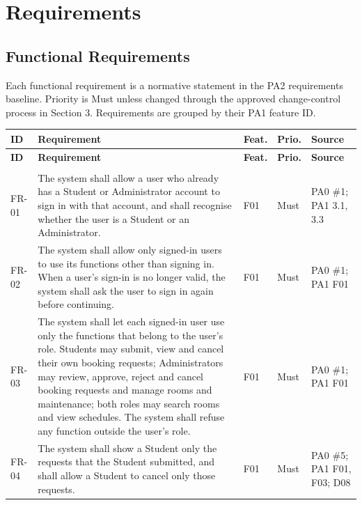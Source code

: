\section{Requirements}
\subsection{Functional Requirements}
Each functional requirement is a normative statement in the PA2 requirements baseline. Priority is Must unless changed through the approved change-control process in Section 3. Requirements are grouped by their PA1 feature ID.

\begingroup
\small
{}
\setlength{\tabcolsep}{3pt}
\renewcommand{\arraystretch}{1.12}
\begin{longtable}{|>{\raggedright\arraybackslash}p{}|>{\raggedright\arraybackslash}p{}|>{\raggedright\arraybackslash}p{}|>{\raggedright\arraybackslash}p{}|>{\raggedright\arraybackslash}p{}|}
\hline
\textbf{ID} & \textbf{Requirement} & \textbf{Feat.} & \textbf{Prio.} & \textbf{Source} \\ \hline
\endfirsthead
\hline
\textbf{ID} & \textbf{Requirement} & \textbf{Feat.} & \textbf{Prio.} & \textbf{Source} \\ \hline
\endhead
\hline
\endfoot
\hline
\endlastfoot
\multicolumn{5}{|l|}{\textbf{F01 Authentication and access control}} \\ \hline
FR-01 & The system shall allow a user who already has a Student or Administrator account to sign in with that account, and shall recognise whether the user is a Student or an Administrator. & F01 & Must & PA0 \#1; PA1 3.1, 3.3 \\ \hline
FR-02 & The system shall allow only signed-in users to use its functions other than signing in. When a user's sign-in is no longer valid, the system shall ask the user to sign in again before continuing. & F01 & Must & PA0 \#1; PA1 F01 \\ \hline
FR-03 & The system shall let each signed-in user use only the functions that belong to the user's role. Students may submit, view and cancel their own booking requests; Administrators may review, approve, reject and cancel booking requests and manage rooms and maintenance; both roles may search rooms and view schedules. The system shall refuse any function outside the user's role. & F01 & Must & PA0 \#1; PA1 F01 \\ \hline
FR-04 & The system shall show a Student only the requests that the Student submitted, and shall allow a Student to cancel only those requests. & F01 & Must & PA0 \#5; PA1 F01, F03; D08 \\ \hline

\end{longtable}
